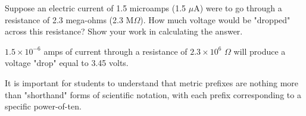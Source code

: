 

Suppose an electric current of 1.5 microamps (1.5 $\mu$A) were to go through a resistance of 2.3 mega-ohms (2.3 M$\Omega$).  How much voltage would be "dropped" across this resistance?  Show your work in calculating the answer.







$1.5 \times 10^{-6}$ amps of current through a resistance of $2.3 \times 10^6$ $\Omega$ will produce a voltage "drop" equal to 3.45 volts.







It is important for students to understand that metric prefixes are nothing more than "shorthand" forms of scientific notation, with each prefix corresponding to a specific power-of-ten.




